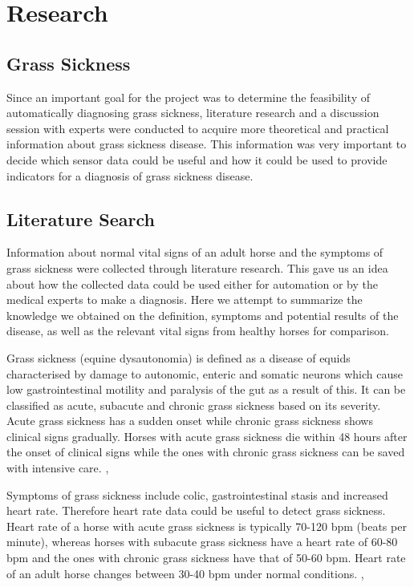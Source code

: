 \chapter{Research}
\label{chap:research}

\section{Grass Sickness}
Since an important goal for the project was to determine the feasibility of automatically diagnosing grass sickness, literature research and a discussion session with experts were conducted to acquire more theoretical and practical information about grass sickness disease. This information was very important to decide which sensor data could be useful and how it could be used to provide indicators for a diagnosis of grass sickness disease.  


\section{Literature Search}
Information about normal vital signs of an adult horse and the symptoms of grass sickness were collected through literature research. This gave us an idea about how the collected data could be used either for automation or by the medical experts to make a diagnosis. Here we attempt to summarize the knowledge we obtained on the definition, symptoms and potential results of the disease, as well as the relevant vital signs from healthy horses for comparison.

Grass sickness (equine dysautonomia) is defined as a disease of equids characterised by damage to autonomic, enteric and somatic neurons which cause low gastrointestinal motility and paralysis of the gut as a result of this. It can be classified as acute, subacute and chronic grass sickness based on its severity. Acute grass sickness has a sudden onset while chronic grass sickness shows clinical signs gradually. Horses with acute grass sickness die within 48 hours after the onset of clinical signs while the ones with chronic grass sickness can be saved with intensive care. \cite{robinson2009current}, \cite{edwards2010edaphic} \cite{web}

Symptoms of grass sickness include colic, gastrointestinal stasis and increased heart rate. Therefore heart rate data could be useful to detect grass sickness. Heart rate of a horse with acute grass sickness is typically 70-120 bpm (beats per minute), whereas horses with subacute grass sickness have a heart rate of 60-80 bpm and the ones with chronic grass sickness have that of 50-60 bpm. Heart rate of an adult horse changes between 30-40 bpm under normal conditions. \cite{corley2009equine}, \cite{robinson2009current}

